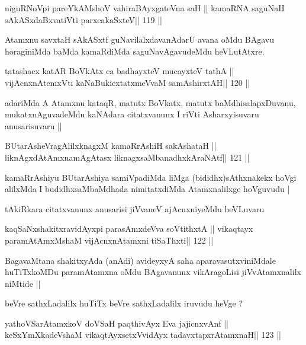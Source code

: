 \begin{shl}
niguRNoV\s pi pareYkAMshoV vahiraBAyxgateVna saH ||
kamaRNA saguNaH sAkASxdaBxvatiVti parxcakaSxteV\hfill || 119 ||
\end{shl}

\begin{artha}
Atamxnu savxtaH sAkASxtf guNavilalxdavanAdarU avana oMdu BAgavu
horaginiMda baMda kamaRdiMda saguNavAgavudeMdu heVLutAtxre.
\end{artha}

\begin{shl}
tatashacx katAR BoVkAtx ca badhayxteV mucayxteV tathA ||
vijAcnxnAtemxVti kaNaBukicxtatxmeVvaM samAshirxtAH\hfill || 120 ||
\end{shl}

\begin{artha}
adariMda A Atamxnu kataqR, matutx BoVkatx, matutx baMdhisalapxDuvanu,
mukatxnAguvadeMdu kaNAdara citatxvanunx I riVti Asharxyisuvaru
anusarisuvaru ||
\end{artha}

\begin{shl}
BUtarAsheVragAlilxknagxM kamaRrAshiH sakAshataH ||
liknAgxdAtAmxnamAgAtasx liknagxsaMbanadhxkAraNAtf\hfill || 121 ||
\end{shl}

\begin{artha}
kamaRrAshiyu BUtarAshiya samiVpadiMda liMga (bididhx)sAthxnakekx hoVgi
alilxMda I budidhxsaMbaMdhada nimitatxdiMda Atamxnalilxge  hoVguvudu |
\end{artha}

\begin{artha}
tAkiRkara citatxvanunx anusarisi jiVvaneV ajAcnxniyeMdu heVLuvaru
\end{artha}

\begin{shl}
kaqSaNxshakitxravidAyx\s pi parasAmxdeVva soVtithxtA ||
vikaqtayx paramAtAmxMshaM vijAcnxnAtamxni tiSaThxti\hfill || 122 ||
\end{shl}

\begin{artha}
BagavaMtana shakitxyAda (anAdi) avideyxyA saha aparavasutxviniMdale
huTiTxkoMDu paramAtamxna oMdu BAgavanunx vikAragoLisi jiVvAtamxnalilx
niMtide ||

beVre sathxLadalilx huTiTx beVre sathxLadalilx iruvudu heVge ?
\end{artha}

\begin{shl}
yathoVSarAtamxkoV doVSaH paqthivAyx Eva jajicnxvAnf ||
keSxYmXkadeVshaM vikaqtAyx\s\s setxV\s vidAyx tadavxtapxrAtamxnaH\hfill || 123 ||
\end{shl}

